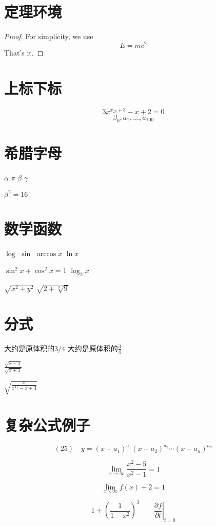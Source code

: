\documentclass{article}
\begin{document}
\section{定理环境}
    \begin{proof}
    For simplicity, we use
    \[
    E=mc^2
    \]
    That's it.
    \end{proof}

\section{上标下标}
    $$3x^{x_{20} + 3} - x + 2 = 0$$
    $$\beta_0,a_1,...,a_{100}$$

\section{希腊字母} 
    $\alpha$
    $\pi$
    $\beta$
    $\gamma$

    $\beta^2 = 16$

\section{数学函数}
    $\log$
    $\sin$
    $\arccos x$
    $\ln x$

    $\sin^2 x+\cos^2 x = 1$
    $\log_2 x$

    $\sqrt{x ^ 2 + y ^ 2}$
    $\sqrt{2 + \sqrt[3]{9}}$ %

\section{分式}
大约是原体积的$3/4$
大约是原体积的$\frac{3}{4}$

$\frac{\sqrt{x-1}}{\sqrt{x+1}}$

$\sqrt{\frac{x}{x^{11} - x + 3}}$

\section{复杂公式例子}

\[
(25)\quad y=\left(x-a_{1}\right)^{a_{1}}\left(x-a_{2}\right)^{a_{2}} \cdots\left(x-a_{n}\right)^{a_{n}}
\]

\[
\lim _{x \rightarrow \infty} \frac{x^{2}-5}{x^{2}-1}=1
\]

$$\lim _{x \ddots \infty} {f(x)+ 2} = 1$$

\[1 + \left(\frac{1}{1-x^{2}}
\right)^3 \qquad
\left.\frac{\partial f}{\partial t}
\right|_{t=0}\]
\end{document}

